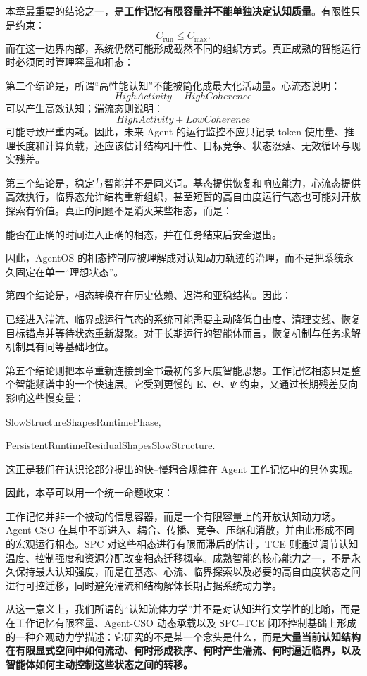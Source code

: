 本章最重要的结论之一，是\textbf{工作记忆有限容量并不能单独决定认知质量}。有限性只是约束：
\[
C_{\mathrm{run}}
\leq
C_{\max}.
\]
而在这一边界内部，系统仍然可能形成截然不同的组织方式。真正成熟的智能运行时必须同时管理容量和相态：
\begin{statementbox}
\centering
{}
\end{statementbox}

第二个结论是，所谓“高性能认知”不能被简化成最大化活动量。心流态说明：
\[
HighActivity
+
HighCoherence
\]
可以产生高效认知；湍流态则说明：
\[
HighActivity
+
LowCoherence
\]
可能导致严重内耗。因此，未来 Agent 的运行监控不应只记录 token 使用量、推理长度和计算负载，还应该估计结构相干性、目标竞争、状态涨落、无效循环与现实残差。

第三个结论是，稳定与智能并不是同义词。基态提供恢复和响应能力，心流态提供高效执行，临界态允许结构重新组织，甚至短暂的高自由度运行气态也可能对开放探索有价值。真正的问题不是消灭某些相态，而是：
\begin{conclusion}
能否在正确的时间进入正确的相态，并在任务结束后安全退出。
\end{conclusion}
因此，AgentOS 的相态控制应被理解成对认知动力轨迹的治理，而不是把系统永久固定在单一“理想状态”。

第四个结论是，相态转换存在历史依赖、迟滞和亚稳结构。因此：
\begin{statementbox}
\centering
{}
\end{statementbox}
已经进入湍流、临界或运行气态的系统可能需要主动降低自由度、清理支线、恢复目标锚点并等待状态重新凝聚。对于长期运行的智能体而言，恢复机制与任务求解机制具有同等基础地位。

第五个结论则把本章重新连接到全书最初的多尺度智能思想。工作记忆相态只是整个智能频谱中的一个快速层。它受到更慢的 E、$\Theta$、$\Psi$ 约束，又通过长期残差反向影响这些慢变量：
\begin{statementbox}
SlowStructureShapesRuntimePhase,
\end{statementbox}
\begin{statementbox}
PersistentRuntimeResidualShapesSlowStructure.
\end{statementbox}
这正是我们在认识论部分提出的快--慢耦合规律在 Agent 工作记忆中的具体实现。

因此，本章可以用一个统一命题收束：

\begin{proposition*}
工作记忆并非一个被动的信息容器，而是一个有限容量上的开放认知动力场。Agent-CSO 在其中不断进入、耦合、传播、竞争、压缩和消散，并由此形成不同的宏观运行相态。SPC 对这些相态进行有限而滞后的估计，TCE 则通过调节认知温度、控制强度和资源分配改变相态迁移概率。成熟智能的核心能力之一，不是永久保持最大认知强度，而是在基态、心流、临界探索以及必要的高自由度状态之间进行可控迁移，同时避免湍流和结构解体长期占据系统动力学。
\end{proposition*}

从这一意义上，我们所谓的“认知流体力学”并不是对认知进行文学性的比喻，而是在工作记忆有限容量、Agent-CSO 动态承载以及 SPC--TCE 闭环控制基础上形成的一种介观动力学描述：它研究的不是某一个念头是什么，而是\textbf{大量当前认知结构在有限显式空间中如何流动、何时形成秩序、何时产生湍流、何时逼近临界，以及智能体如何主动控制这些状态之间的转移。}
